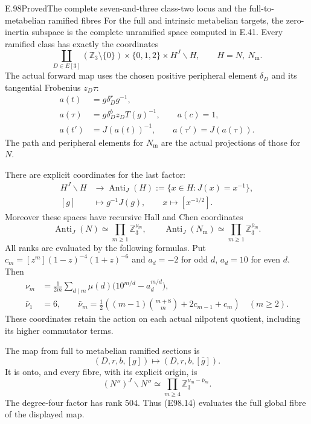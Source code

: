 \begin{statement}{E.98}{Proved}{The complete seven-and-three class-two locus and the full-to-metabelian ramified fibres}
For the full and intrinsic metabelian targets, the
zero-inertia subspace is the complete unramified space
computed in E.41. Every ramified class has exactly the
coordinates
\[
 \coprod_{D\in E[3]}
  (\mathbb Z_3\setminus\{0\})\times\{0,1,2\}
                                  \times H^J\backslash H,
             \qquad H=N,\ N_{\mathrm m}.
 \tag{E98.8}
\]
The actual forward map uses the chosen positive peripheral
element $\delta_D$ and its tangential Frobenius $z_D\tau$:
\[
 \begin{split}
 a(t)&=g\delta_D^r g^{-1},\\
 a(\tau)&=g\delta_D^b z_DT(g)^{-1},\qquad a(c)=1,\\
 a(t')&=J(a(t))^{-1},\qquad a(\tau')=J(a(\tau)).
 \end{split}
 \tag{E98.9}
\]
The path and peripheral elements for $N_{\mathrm m}$ are
the actual projections of those for $N$.

There are explicit coordinates for the last factor:
\[
 \begin{split}
 H^J\backslash H&\longrightarrow
       \operatorname{Anti}_J(H):=\{x\in H:J(x)=x^{-1}\},\\
 [g]&\longmapsto g^{-1}J(g),\qquad
 x\longmapsto[x^{-1/2}].
 \end{split}
 \tag{E98.10}
\]
Moreover these spaces have recursive Hall and Chen
coordinates
\[
 \operatorname{Anti}_J(N)\simeq
       \prod_{m\ge1}\mathbb Z_3^{\nu_m},\qquad
 \operatorname{Anti}_J(N_{\mathrm m})\simeq
       \prod_{m\ge1}\mathbb Z_3^{\bar\nu_m}.
 \tag{E98.11}
\]
All ranks are evaluated by the following formulas. Put
$c_m=[z^m](1-z)^{-4}(1+z)^{-6}$ and
$a_d=-2$ for odd $d$, $a_d=10$ for even $d$. Then
\[
 \begin{split}
 \nu_m&=\frac1{2m}\sum_{d\mid m}\mu(d)
                       \bigl(10^{m/d}-a_d^{m/d}\bigr),\\
 \bar\nu_1&=6,\qquad
 \bar\nu_m=\frac12\left((m-1)\binom{m+8}{m}
                                  +2c_{m-1}+c_m\right)
                                    \quad(m\ge2).
 \end{split}
 \tag{E98.12}
\]
These coordinates retain the action on each actual
nilpotent quotient, including its higher commutator terms.

The map from full to metabelian ramified sections is
\[
       (D,r,b,[g])\longmapsto(D,r,b,[\bar g]).
 \tag{E98.13}
\]
It is onto, and every fibre, with its explicit origin, is
\[
 (N'')^J\backslash N''\simeq
       \prod_{m\ge4}\mathbb Z_3^{\nu_m-\bar\nu_m}.
 \tag{E98.14}
\]
The degree-four factor has rank $504$. Thus (E98.14)
evaluates the full global fibre of the displayed map.


\end{statement}

